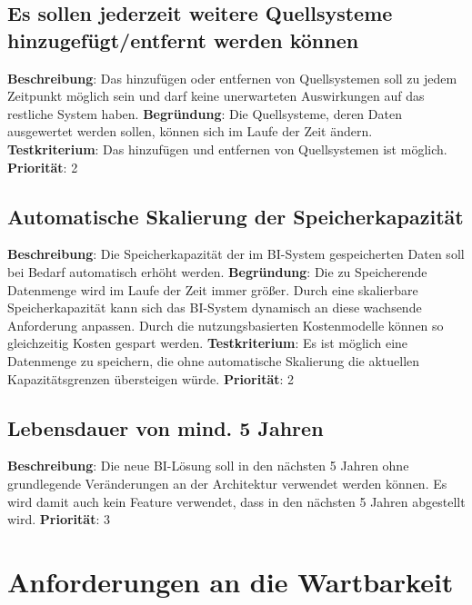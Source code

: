 \subsection{Es sollen jederzeit weitere Quellsysteme hinzugefügt/entfernt werden können} \label{sec:anforderungsspezifikation:QuellsystemeÄndern}
\textbf{Beschreibung}: Das hinzufügen oder entfernen von Quellsystemen soll zu jedem Zeitpunkt möglich sein und darf keine unerwarteten Auswirkungen auf das restliche System haben.
\newline \textbf{Begründung}: Die Quellsysteme, deren Daten ausgewertet werden sollen, können sich im Laufe der Zeit ändern.
\newline \textbf{Testkriterium}: Das hinzufügen und entfernen von Quellsystemen ist möglich.
\newline \textbf{Priorität}: 2

\subsection{Automatische Skalierung der Speicherkapazität} \label{sec:anforderungsspezifikation:skalierungDerSpeicherkapazität}
\textbf{Beschreibung}: Die Speicherkapazität der im BI-System gespeicherten Daten soll bei Bedarf automatisch erhöht werden.
\newline \textbf{Begründung}: Die zu Speicherende Datenmenge wird im Laufe der Zeit immer größer. Durch eine skalierbare Speicherkapazität kann sich das BI-System dynamisch an diese wachsende Anforderung anpassen. Durch die nutzungsbasierten Kostenmodelle können so gleichzeitig Kosten gespart werden.
\newline \textbf{Testkriterium}: Es ist möglich eine Datenmenge zu speichern, die ohne automatische Skalierung die aktuellen Kapazitätsgrenzen übersteigen würde.
\newline \textbf{Priorität}: 2

\subsection{Lebensdauer von mind. 5 Jahren} \label{sec:anforderungsspezifikation:langlebigkeit}
\textbf{Beschreibung}: Die neue BI-Lösung soll in den nächsten 5 Jahren ohne grundlegende Veränderungen an der Architektur verwendet werden können. Es wird damit auch kein Feature verwendet, dass in den nächsten 5 Jahren abgestellt wird.
\newline \textbf{Priorität}: 3

\section{Anforderungen an die Wartbarkeit}


